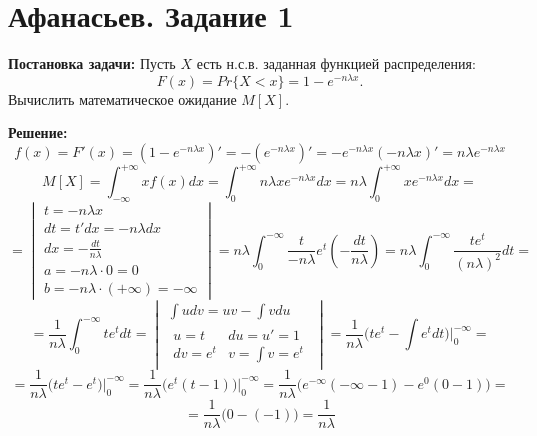 \section{Афанасьев. Задание 1}

\textbf{Постановка задачи:}
Пусть $X$ есть н.с.в. заданная функцией распределения:
$$F(x)=Pr\{ X < x \}=1-e^{-n \lambda x}.$$
Вычислить математическое ожидание $M[X]$.

\textbf{Решение:}
$$
f(x) =
F'(x) =
(1-e^{-n \lambda x})' =
-(e^{-n \lambda x})' =
-e^{-n \lambda x} (-n \lambda x)' =
n \lambda e^{-n \lambda x} 
$$
$$
M[X]= \int_{- \infty }^{+ \infty}{x f(x) dx}=
\int_{0}^{+ \infty}{n \lambda x e^{-n \lambda x} dx}=
n \lambda \int_{0}^{+ \infty}{x e^{-n \lambda x} dx}=
$$
$$
= \begin{vmatrix}
t=-n \lambda x \\
dt=t' dx=-n \lambda dx \\
dx=- \frac{dt}{n \lambda} \\
a=-n \lambda \cdot 0=0 \\
b=-n \lambda \cdot (+ \infty)=- \infty 
\end{vmatrix}=
n \lambda \int_{0}^{- \infty}{ \frac{t}{-n \lambda} e^t (- \frac{dt}{n
\lambda})}=
n \lambda \int_{0}^{- \infty}{ \frac{t e^t}{(n \lambda)^2} dt}=
$$
$$
= \frac{1}{n \lambda} \int_{0}^{- \infty}{t e^t dt}=
\begin{vmatrix}
\int{udv}=uv- \int{vdu} \\
\begin{matrix}
u=t & du=u'=1 \\
dv=e^t & v= \int{v}=e^t
\end{matrix}
\end{vmatrix}=
\frac{1}{n \lambda} \bigg (t e^t- \int{e^t dt} \bigg )  \bigg |_{0}^{-
\infty}=
$$
$$
= \frac{1}{n \lambda} \bigg (t e^t- e^t \bigg ) \bigg |_{0}^{- \infty}=
\frac{1}{n \lambda} \bigg (e^t (t-1) \bigg ) \bigg |_{0}^{- \infty}=
\frac{1}{n \lambda} \bigg (e^{- \infty} (- \infty-1)-e^0 (0-1) \bigg )=
$$
$$
= \frac{1}{n \lambda} \bigg (0-(-1) \bigg )=
\frac{1}{n \lambda}
$$